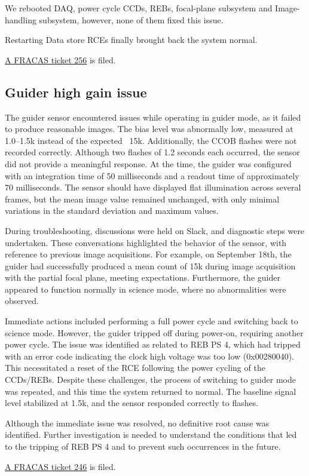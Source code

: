 We rebooted DAQ, power cycle CCDs, REBs, focal-plane subsystem and Image-handling subsystem, however, none of them fixed this issue. 

Restarting Data store RCEs finally brought back the system normal. 

\href{https://rubinobs.atlassian.net/browse/FRACAS-256}{A FRACAS ticket 256} is filed. 

\clearpage
\subsection{Guider high gain issue}\label{sec:guider:highgain}

The guider sensor encountered issues while operating in guider mode, as it failed to produce reasonable images. The bias level was abnormally low, measured at 1.0–1.5k instead of the expected ~15k. Additionally, the CCOB flashes were not recorded correctly. Although two flashes of 1.2 seconds each occurred, the sensor did not provide a meaningful response. At the time, the guider was configured with an integration time of 50 milliseconds and a readout time of approximately 70 milliseconds. The sensor should have displayed flat illumination across several frames, but the mean image value remained unchanged, with only minimal variations in the standard deviation and maximum values.

During troubleshooting, discussions were held on Slack, and diagnostic steps were undertaken. These conversations highlighted the behavior of the sensor, with reference to previous image acquisitions. For example, on September 18th, the guider had successfully produced a mean count of 15k during image acquisition with the partial focal plane, meeting expectations. Furthermore, the guider appeared to function normally in science mode, where no abnormalities were observed.

Immediate actions included performing a full power cycle and switching back to science mode. However, the guider tripped off during power-on, requiring another power cycle. The issue was identified as related to REB PS 4, which had tripped with an error code indicating the clock high voltage was too low (0x00280040). This necessitated a reset of the RCE following the power cycling of the CCDs/REBs. Despite these challenges, the process of switching to guider mode was repeated, and this time the system returned to normal. The baseline signal level stabilized at 1.5k, and the sensor responded correctly to flashes.

Although the immediate issue was resolved, no definitive root cause was identified. Further investigation is needed to understand the conditions that led to the tripping of REB PS 4 and to prevent such occurrences in the future.

\href{https://rubinobs.atlassian.net/browse/FRACAS-246}{A FRACAS ticket 246} is filed. 

